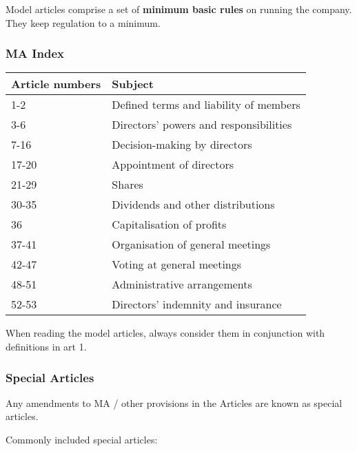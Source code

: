 \documentclass[
]{article}
\newenvironment{Shaded}{}{}
\newcommand{\NormalTok}[1]{#1}
\begin{document}
Model articles comprise a set of \textbf{minimum basic rules} on running
the company. They keep regulation to a minimum.

\hypertarget{ma-index}{%
\subsubsection{MA Index}\label{ma-index}}

\begin{longtable}[]{@{}ll@{}}
\toprule()
Article numbers & Subject \\
\midrule()
\endhead
1-2 & Defined terms and liability of members \\
3-6 & Directors' powers and responsibilities \\
7-16 & Decision-making by directors \\
17-20 & Appointment of directors \\
21-29 & Shares \\
30-35 & Dividends and other distributions \\
36 & Capitalisation of profits \\
37-41 & Organisation of general meetings \\
42-47 & Voting at general meetings \\
48-51 & Administrative arrangements \\
52-53 & Directors' indemnity and insurance \\
\bottomrule()
\end{longtable}

When reading the model articles, always consider them in conjunction
with definitions in art 1.

\hypertarget{special-articles}{%
\subsubsection{Special Articles}\label{special-articles}}

\begin{Shaded}
\begin{Highlighting}[]
\NormalTok{Any amendments to MA / other provisions in the Articles are known as \textquotesingle{}special articles\textquotesingle{}.}
\end{Highlighting}
\end{Shaded}

Commonly included special articles:
\end{document}
